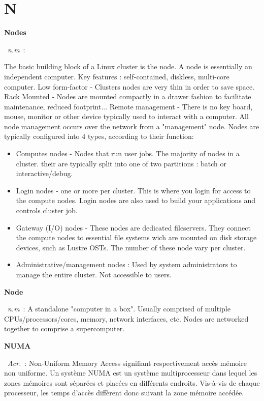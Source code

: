 \documentclass[10pt,a4paper,twoside]{article} %
\newcommand{\entry}[3]{\textbf{#1}\markboth{#1}{#1}\  \textit{#2}\ :  {#3}} %
\begin{document}

\section*{N}

\begin{multicols}{2}

\entry{Nodes}{n.m}{The basic building block of a Linux cluster is the node. A node is essentially an independent computer. Key features : self-contained, diskless, multi-core computer. Low form-factor - Clusters nodes are very thin in order to save space. Rack Mounted - Nodes are mounted compactly in a drawer fashion to facilitate maintenance, reduced footprint... Remote management - There is no key board, mouse, monitor or other device typically used to interact with a computer. All node management occurs over the network from a "management" node. 
Nodes are typically configured into 4 types, according to their function:
\begin{itemize}
  \item Computes nodes - Nodes that run user jobs. The majority of nodes in a cluster. their are typically split into one of two partitions : batch or interactive/debug.
  \item Login nodes - one or more per cluster. This is where you login for access to the compute nodes. Login nodes are also used to build your applications and controls cluster job.
  \item Gateway (I/O) nodes - These nodes are dedicated fileservers. They connect the compute nodes to essential file systems wich are mounted on disk storage devices, such as Lustre OSTs. The number of these node vary per cluster.
  \item Administrative/management nodes : Used by system administrators to manage the entire cluster. Not accessible to users.
\end{itemize}}

\entry{Node}{n.m}{A standalone "computer in a box". Usually comprised of multiple CPUs/processors/cores, memory, network interfaces, etc. Nodes are networked together to comprise a supercomputer.}

\entry{NUMA}{Acr.}{Non-Uniform Memory Access signifiant respectivement accès mémoire non uniforme. Un système NUMA est un système multiprocesseur dans lequel les zones mémoires sont séparées et placées en différents endroits. Vis-à-vis de chaque processeur, les temps d'accès diffèrent donc suivant la zone mémoire accédée.}


\end{multicols}
\end{document}
